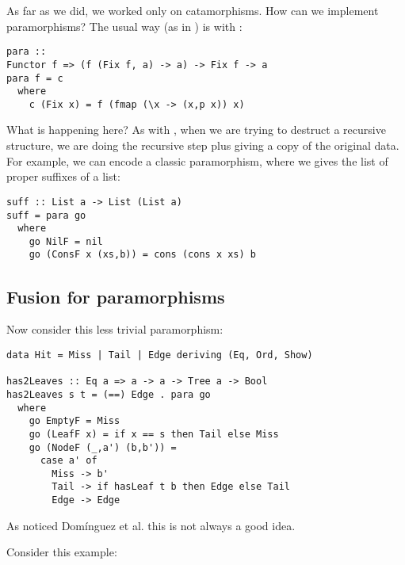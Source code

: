 
As far as we did, we worked only on catamorphisms. How can we implement paramorphisms?
The usual way (as in \cite{ekmett:eschems}) is with :
\begin{verbatim}
para ::
Functor f => (f (Fix f, a) -> a) -> Fix f -> a
para f = c
  where
    c (Fix x) = f (fmap (\x -> (x,p x)) x)
\end{verbatim}

What is happening here? As with , when we are trying to destruct a recursive structure, we are doing the recursive step plus giving a copy of the original data.
For example, we can encode a classic paramorphism, where we gives the list of proper suffixes of a list:
\begin{verbatim}
suff :: List a -> List (List a)
suff = para go
  where
    go NilF = nil
    go (ConsF x (xs,b)) = cons (cons x xs) b
\end{verbatim}

\subsection{Fusion for paramorphisms}

Now consider this less trivial paramorphism:
\begin{verbatim}
data Hit = Miss | Tail | Edge deriving (Eq, Ord, Show)

has2Leaves :: Eq a => a -> a -> Tree a -> Bool
has2Leaves s t = (==) Edge . para go
  where
    go EmptyF = Miss
    go (LeafF x) = if x == s then Tail else Miss
    go (NodeF (_,a') (b,b')) =
      case a' of
        Miss -> b'
        Tail -> if hasLeaf t b then Edge else Tail
        Edge -> Edge
\end{verbatim}


As noticed Domínguez et al. \cite{paramorphismFusion} this is not always a good idea.

Consider this example:
